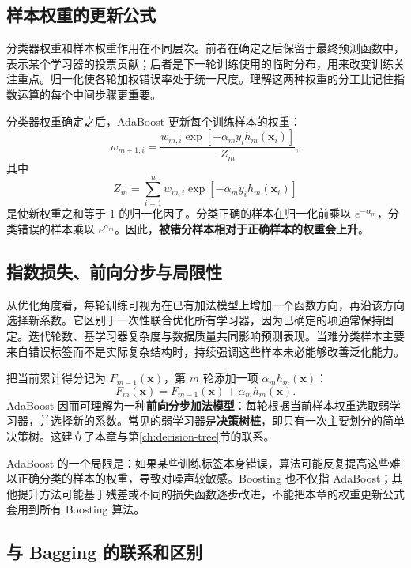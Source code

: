 \subsection{样本权重的更新公式}

分类器权重和样本权重作用在不同层次。前者在确定之后保留于最终预测函数中，表示某个学习器的投票贡献；后者是下一轮训练使用的临时分布，用来改变训练关注重点。归一化使各轮加权错误率处于统一尺度。理解这两种权重的分工比记住指数运算的每个中间步骤更重要。

分类器权重确定之后，AdaBoost 更新每个训练样本的权重：
\begin{equation}\label{eq:adaboost-reweight}
\boxed{
w_{m+1,i}=
\frac{w_{m,i}\exp[-\alpha_m y_i h_m(\boldsymbol x_i)]}{Z_m},
}
\end{equation}
其中
\begin{equation}\label{eq:adaboost-normalization}
Z_m=\sum_{i=1}^{n}w_{m,i}
\exp[-\alpha_m y_i h_m(\boldsymbol x_i)]
\end{equation}
是使新权重之和等于 $1$ 的归一化因子。分类正确的样本在归一化前乘以 $e^{-\alpha_m}$，分类错误的样本乘以 $e^{\alpha_m}$。因此，\textbf{被错分样本相对于正确样本的权重会上升}。

\subsection{指数损失、前向分步与局限性}

从优化角度看，每轮训练可视为在已有加法模型上增加一个函数方向，再沿该方向选择新系数。它区别于一次性联合优化所有学习器，因为已确定的项通常保持固定。迭代轮数、基学习器复杂度与数据质量共同影响预测表现。当难分类样本主要来自错误标签而不是实际复杂结构时，持续强调这些样本未必能够改善泛化能力。

把当前累计得分记为 $F_{m-1}(\boldsymbol x)$，第 $m$ 轮添加一项 $\alpha_mh_m(\boldsymbol x)$：
\[
F_m(\boldsymbol x)=F_{m-1}(\boldsymbol x)
+\alpha_m h_m(\boldsymbol x).
\]
AdaBoost 因而可理解为一种\textbf{前向分步加法模型}：每轮根据当前样本权重选取弱学习器，并选择新的系数。常见的弱学习器是\textbf{决策树桩}，即只有一次主要划分的简单决策树。这建立了本章与第\ref{ch:decision-tree}节的联系。

AdaBoost 的一个局限是：如果某些训练标签本身错误，算法可能反复提高这些难以正确分类的样本的权重，导致对噪声较敏感。Boosting 也不仅指 AdaBoost；其他提升方法可能基于残差或不同的损失函数逐步改进，不能把本章的权重更新公式套用到所有 Boosting 算法。

\subsection{与 Bagging 的联系和区别}

